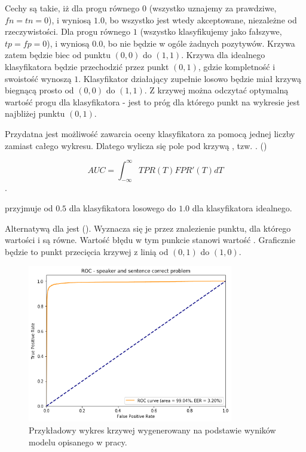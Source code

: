 Cechy  są takie, iż dla progu równego $0$ (wszystko uznajemy za prawdziwe, $fn = tn = 0$), 
 i  
wyniosą $1.0$, bo wszystko jest wtedy akceptowane, niezależne od rzeczywistości. 
Dla progu równego $1$ (wszystko klasyfikujemy jako fałszywe, $tp = fp = 0$), 
 i  wyniosą $0.0$, bo nie będzie w ogóle żadnych pozytywów.
Krzywa zatem będzie biec od punktu $(0, 0)$ do $(1, 1)$. Krzywa dla idealnego klasyfikatora
będzie przechodzić przez punkt $(0, 1)$, gdzie kompletność i swoistość wynoszą $1$. Klasyfikator
działający zupełnie losowo będzie miał krzywą biegnącą prosto od $(0, 0)$ do $(1, 1)$. Z krzywej
 można odczytać optymalną wartość progu dla klasyfikatora - jest to próg dla którego punkt
na wykresie jest najbliżej punktu $(0, 1)$.

Przydatna jest możliwość zawarcia oceny klasyfikatora za pomocą jednej liczby zamiast całego wykresu.
Dlatego wylicza się pole pod krzywą , tzw. . ()

$$\mathit{AUC} = \int_{-\infty}^{\infty} \mathit{TPR}(T) \mathit{FPR}'(T) dT$$. 

 przyjmuje od $0.5$ dla klasyfikatora losowego do $1.0$ dla klasyfikatora idealnego.

Alternatywą dla  jest  (). Wyznacza się je
przez znalezienie punktu, dla którego wartości  i  są równe. Wartość błędu 
w tym punkcie stanowi wartość . Graficznie będzie to punkt przecięcia krzywej 
z linią od $(0, 1)$ do $(1, 0)$.

\begin{figure}[H]
    \centering
    \includegraphics[width=0.8\textwidth]{images/2_2_b_roc_example}
    \caption{Przykładowy wykres krzywej  wygenerowany na podstawie wyników modelu  opisanego w pracy.}
    \label{fig:2_2_b_roc_example}
\end{figure}

